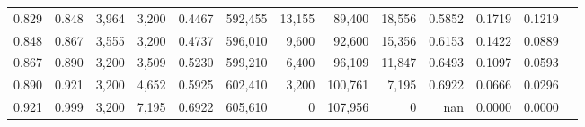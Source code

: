 \begin{tabular}{rrrrrrrrrrrrr}
0.829 & 0.848 &   3,964 & 3,200 &                                     0.4467 & 592,455 &  13,155 &  89,400 &  18,556 & 0.5852 & 0.1719 & 0.1219 \\
0.848 & 0.867 &   3,555 & 3,200 &                                     0.4737 & 596,010 &   9,600 &  92,600 &  15,356 & 0.6153 & 0.1422 & 0.0889 \\
0.867 & 0.890 &   3,200 & 3,509 &                                     0.5230 & 599,210 &   6,400 &  96,109 &  11,847 & 0.6493 & 0.1097 & 0.0593 \\
0.890 & 0.921 &   3,200 & 4,652 &                                     0.5925 & 602,410 &   3,200 & 100,761 &   7,195 & 0.6922 & 0.0666 & 0.0296 \\
0.921 & 0.999 &   3,200 & 7,195 &                                     0.6922 & 605,610 &       0 & 107,956 &       0 &    nan & 0.0000 & 0.0000 \\
\bottomrule
\end{tabular}
